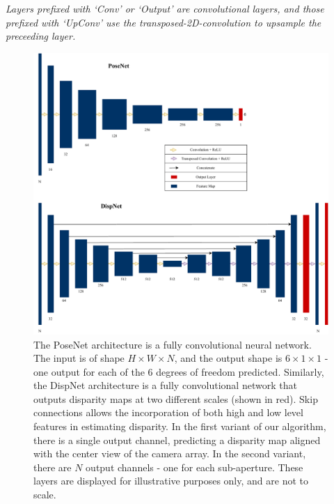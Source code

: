 \begin{table}[h]
    \vspace{4mm}{}
    \textit{Layers prefixed with `Conv' or `Output' are convolutional layers, and those prefixed with `UpConv' use the transposed-2D-convolution to upsample the preceeding layer.}
    
    \label{dispnet-layers}
\end{table}


\begin{figure}
    \includegraphics[width=\textwidth]{images/archs/unifiedarch.pdf}
    \caption[The PoseNet and DispNet convolutional architectures]{The PoseNet architecture is a fully convolutional neural network. The input is of shape $H \times W \times N$, and the output shape is $6 \times 1 \times 1$ - one output for each of the 6 degrees of freedom predicted. Similarly, the DispNet architecture is a fully convolutional network that outputs disparity maps at two different scales (shown in red). Skip connections allows the incorporation of both high and low level features in estimating disparity. In the first variant of our algorithm, there is a single output channel, predicting a disparity map aligned with the center view of the camera array. In the second variant, there are $N$ output channels - one for each sub-aperture. These layers are displayed for illustrative purposes only, and are not to scale. }
\end{figure}

